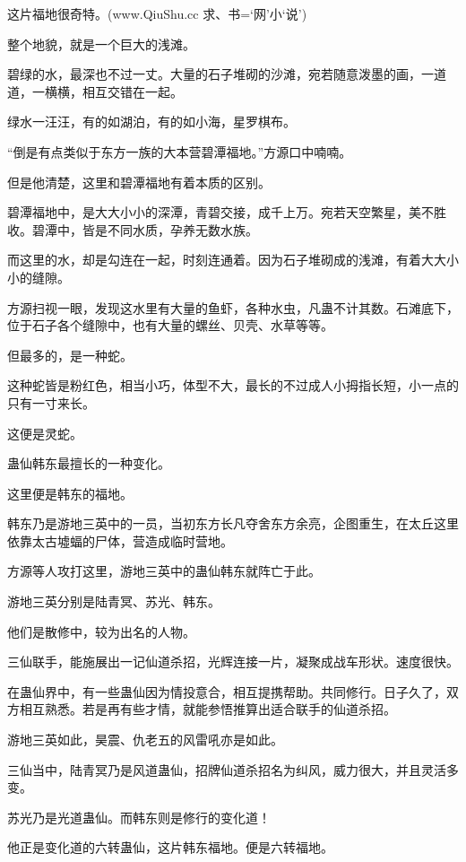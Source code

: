 
\begin{this_body}

这片福地很奇特。(www.QiuShu.cc 求、书=‘网’小‘说’)

整个地貌，就是一个巨大的浅滩。

碧绿的水，最深也不过一丈。大量的石子堆砌的沙滩，宛若随意泼墨的画，一道道，一横横，相互交错在一起。

绿水一汪汪，有的如湖泊，有的如小海，星罗棋布。

“倒是有点类似于东方一族的大本营碧潭福地。”方源口中喃喃。

但是他清楚，这里和碧潭福地有着本质的区别。

碧潭福地中，是大大小小的深潭，青碧交接，成千上万。宛若天空繁星，美不胜收。碧潭中，皆是不同水质，孕养无数水族。

而这里的水，却是勾连在一起，时刻连通着。因为石子堆砌成的浅滩，有着大大小小的缝隙。

方源扫视一眼，发现这水里有大量的鱼虾，各种水虫，凡蛊不计其数。石滩底下，位于石子各个缝隙中，也有大量的螺丝、贝壳、水草等等。

但最多的，是一种蛇。

这种蛇皆是粉红色，相当小巧，体型不大，最长的不过成人小拇指长短，小一点的只有一寸来长。

这便是灵蛇。

蛊仙韩东最擅长的一种变化。

这里便是韩东的福地。

韩东乃是游地三英中的一员，当初东方长凡夺舍东方余亮，企图重生，在太丘这里依靠太古墟蝠的尸体，营造成临时营地。

方源等人攻打这里，游地三英中的蛊仙韩东就阵亡于此。

游地三英分别是陆青冥、苏光、韩东。

他们是散修中，较为出名的人物。

三仙联手，能施展出一记仙道杀招，光辉连接一片，凝聚成战车形状。速度很快。

在蛊仙界中，有一些蛊仙因为情投意合，相互提携帮助。共同修行。日子久了，双方相互熟悉。若是再有些才情，就能参悟推算出适合联手的仙道杀招。

游地三英如此，昊震、仇老五的风雷吼亦是如此。

三仙当中，陆青冥乃是风道蛊仙，招牌仙道杀招名为纠风，威力很大，并且灵活多变。

苏光乃是光道蛊仙。而韩东则是修行的变化道！

他正是变化道的六转蛊仙，这片韩东福地。便是六转福地。


\end{this_body}
